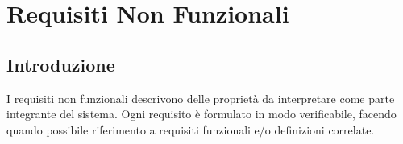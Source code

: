 \setcounter{secnumdepth}{3}

\chapter{Requisiti Non Funzionali}

\setlength{\parskip}{0.4em}
\setlength{\parindent}{0pt}

\section{Introduzione}
I requisiti non funzionali descrivono delle proprietà da interpretare come parte integrante del sistema. Ogni requisito è formulato in modo verificabile, facendo quando possibile riferimento a requisiti funzionali e/o definizioni correlate.

